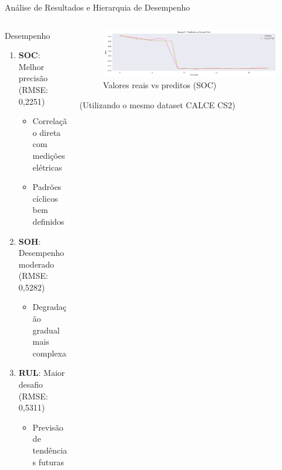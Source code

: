 \documentclass[aspectratio=169,xcolor=dvipsnames]{beamer}
\begin{document}
\begin{frame}{Análise de Resultados e Hierarquia de Desempenho}
  \begin{columns}[T]
    \begin{column}{0.48\textwidth}
      \begin{exampleblock}{Desempenho}
        \begin{enumerate}
          \item \textbf{SOC}: Melhor precisão (RMSE: 0,2251)
            \begin{itemize}
              \item Correlação direta com medições elétricas
              \item Padrões cíclicos bem definidos
            \end{itemize}
          \item \textbf{SOH}: Desempenho moderado (RMSE: 0,5282)
            \begin{itemize}
              \item Degradação gradual mais complexa
            \end{itemize}
          \item \textbf{RUL}: Maior desafio (RMSE: 0,5311)
            \begin{itemize}
              \item Previsão de tendências futuras
            \end{itemize}
        \end{enumerate}
      \end{exampleblock}
    \end{column}
    \begin{column}{0.48\textwidth}
      \begin{figure}
        \centering
        \includegraphics[width=\textwidth]{logos/soc_prediction2.png}
        \caption{Valores reais vs preditos (SOC)}
      \end{figure}
        \begin{table}[h]
          \centering
          \caption{Comparação de Abordagens (RMSE em RUL)}
        \end{table}
        \centering
        \small{(Utilizando o mesmo dataset CALCE CS2)}


\end{column}
\end{columns}
\end{frame}
\end{document}
